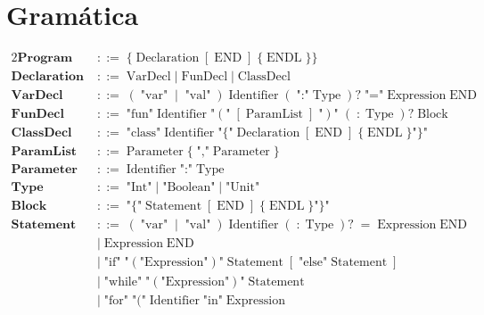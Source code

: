 \documentclass[a4paper,10pt]{article}
\begin{document}
\section*{Gramática}

\begin{alignat*}{2}
\textbf{Program}
  \;&::=\; \{\;\text{Declaration}\;[\;\text{END}\;]\;\{\;\text{ENDL}\;\}\} \\[4pt]
\textbf{Declaration}
  \;&::=\; \text{VarDecl}
   \;|\;\text{FunDecl}
   \;|\;\text{ClassDecl} \\[4pt]
\textbf{VarDecl}
  \;&::=\; (\;\text{"var"}\;\mid\;\text{"val"}\;)\;\text{Identifier}
     \;(\;\text{":"}\;\text{Type}\;)?
     \;\text{"="}\;\text{Expression}\;\text{END} \\[4pt]
\textbf{FunDecl}
  \;&::=\; \text{"fun"}\;\text{Identifier}
     \;\text{"}(\text{"}\;[\;\text{ParamList}\;]\;\text{"})\text{"}
     \;(\;:\;\text{Type}\;)?
     \;\text{Block} \\[4pt]
\textbf{ClassDecl}
  \;&::=\; \text{"class"}\;\text{Identifier}
     \;\text{"}\{\text{"}\;\text{Declaration}\;[\;\text{END}\;]\;\{\;\text{ENDL}\;\}\text{"}\}\text{"} \\[4pt]
\textbf{ParamList}
  \;&::=\; \text{Parameter} \; \{ \; \text{","} \; \text{Parameter} \;\} \\[4pt]
\textbf{Parameter}
  \;&::=\; \text{Identifier}\;\text{":"}\;\text{Type} \\[4pt]
\textbf{Type}
  \;&::=\; \text{"Int"}
   \;|\;\text{"Boolean"}
   \;|\;\text{"Unit"} \\[4pt]
\textbf{Block}
  \;&::=\; \text{"}\{\text{"}\;\text{Statement}\;[\;\text{END}\;]\;\{\;\text{ENDL}\;\}\text{"}\}\text{"} \\[4pt]
\textbf{Statement}
  \;&::=\; (\;\text{"var"}\;\mid\;\text{"val"}\;)\;\text{Identifier}
     \;(\;:\;\text{Type}\;)?
     \;=\;\text{Expression}\;\text{END} \\
  \;&\mid\; \text{Expression}\;\text{END} \\
  \;&\mid\; \text{"if"}\;\text{"}(\text{"} \text{Expression} \text{"})\text{"}\;\text{Statement}
     \;[\;\text{"else"}\;\text{Statement}\;] \\[4pt]
  \;&\mid\; \text{"while"}\;\text{"}(\text{"} \text{Expression} \text{"})\text{"}\;\text{Statement} \\[4pt]
  \;&\mid\; \text{"for"}\;\text{"}(\text{"}\; \text{Identifier}\;\text{"in"}\;\text{Expression}

\end{alignat*}
\end{document}
